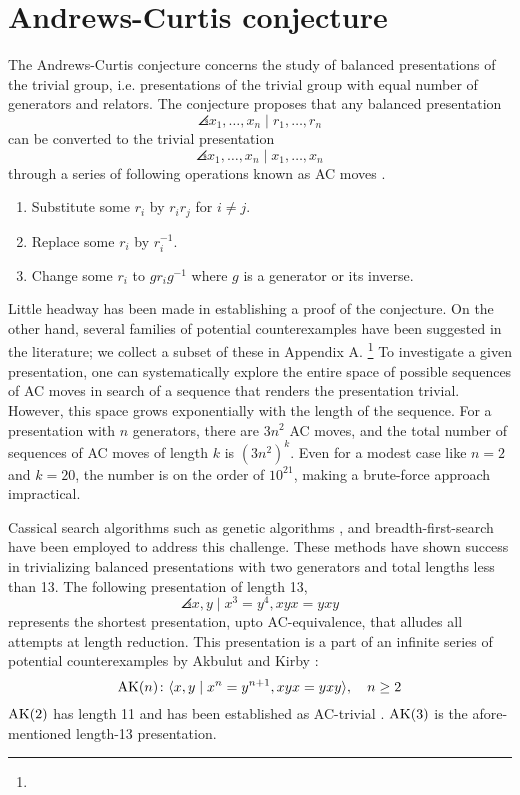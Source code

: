 
\section{Andrews-Curtis conjecture\label{sec:AC}}

The Andrews-Curtis conjecture concerns the study of balanced presentations of the trivial group, i.e. presentations of the trivial group with equal number of generators and relators. The conjecture proposes that any balanced presentation 
\[
\angles{x_1, \dots, x_n \mid r_1, \dots, r_n}
\]
can be converted to the trivial presentation
\[
\angles{x_1, \dots, x_n \mid x_1, \dots, x_n}
\]
through a series of following operations known as AC moves \cite{Andrews-Curtis}.
\begin{enumerate}
	\item Substitute some $r_i$ by $r_i r_j$ for $i \neq j$.
	\item Replace some $r_i$ by $r_i^{-1}$.
	\item Change some $r_i$ to $g r_i g^{-1}$ where $g$ is a generator or its inverse.
\end{enumerate}

Little headway has been made in establishing a proof of the conjecture. On the other hand, several families of potential counterexamples have been suggested in the literature; we collect a subset of these in Appendix A. \footnote{} To investigate a given presentation, one can systematically explore the entire space of possible sequences of AC moves in search of a sequence that renders the presentation trivial. However, this space grows exponentially with the length of the sequence. For a presentation with $n$ generators, there are $3n^2$ AC moves, and the total number of sequences of AC moves of length $k$ is $(3n^2)^k$. Even for a modest case like $n=2$ and $k=20$, the number is on the order of $10^{21}$, making a brute-force approach impractical.
\newline 

Cassical search algorithms such as genetic algorithms \cite{genetic}, and breadth-first-search  \cite{bfs-ac} have been employed to address this challenge. These methods have shown success in trivializing balanced presentations with two generators and total lengths less than 13. The following presentation of length 13,
\[
\angles{x, y \mid x^3 = y^4, xyx = yxy}
\]
represents the shortest presentation, upto AC-equivalence, that alludes all attempts at length reduction. This presentation is a part of an infinite series of potential counterexamples by Akbulut and Kirby \cite{Akbulut-Kirby}:
\[
\text{AK}(n) \colon \langle x, y \mid x^n = y^{n+1}, xyx = yxy\rangle, \quad n \geq 2
\]
$\text{AK}(2)$ has length 11 and has been established as AC-trivial  \cite{genetic}. $\text{AK}(3)$ is the afore-mentioned length-13 presentation. 
\newline

